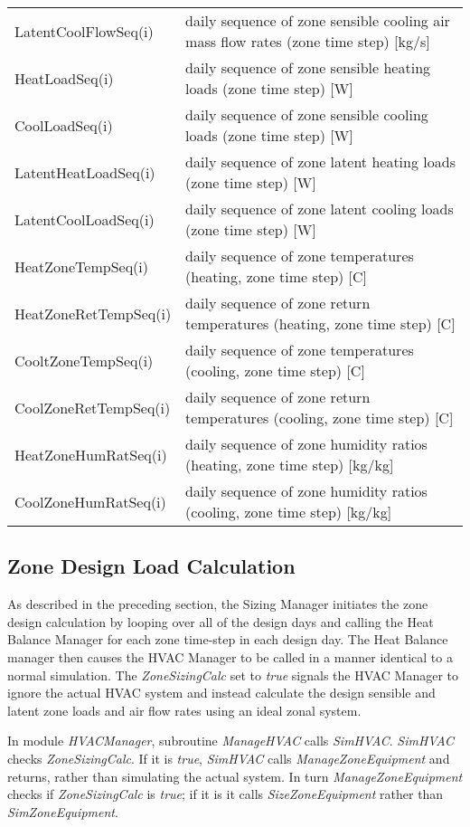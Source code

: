 \begin{longtable}[c]{p{1.85in}p{4.13in}}
LatentCoolFlowSeq(i) & daily sequence of zone sensible cooling air mass flow rates (zone time step) [kg/s] \tabularnewline
HeatLoadSeq(i) & daily sequence of zone sensible heating loads (zone time step) [W] \tabularnewline
CoolLoadSeq(i) & daily sequence of zone sensible cooling loads (zone time step) [W] \tabularnewline
LatentHeatLoadSeq(i) & daily sequence of zone latent heating loads (zone time step) [W] \tabularnewline
LatentCoolLoadSeq(i) & daily sequence of zone latent cooling loads (zone time step) [W] \tabularnewline
HeatZoneTempSeq(i) & daily sequence of zone temperatures (heating, zone time step) [C] \tabularnewline
HeatZoneRetTempSeq(i) & daily sequence of zone return temperatures (heating, zone time step) [C] \tabularnewline
CooltZoneTempSeq(i) & daily sequence of zone temperatures (cooling, zone time step) [C] \tabularnewline
CoolZoneRetTempSeq(i) & daily sequence of zone return temperatures (cooling, zone time step) [C] \tabularnewline
HeatZoneHumRatSeq(i) & daily sequence of zone humidity ratios (heating, zone time step) [kg/kg] \tabularnewline
CoolZoneHumRatSeq(i) & daily sequence of zone humidity ratios (cooling, zone time step) [kg/kg] \tabularnewline
\bottomrule
\end{longtable}

\subsection{Zone Design Load Calculation}\label{zone-design-load-calculation}

As described in the preceding section, the Sizing Manager initiates the zone design calculation by looping over all of the design days and calling the Heat Balance Manager for each zone time-step in each design day. The Heat Balance manager then causes the HVAC Manager to be called in a manner identical to a normal simulation. The \emph{ZoneSizingCalc} set to \emph{true} signals the HVAC Manager to ignore the actual HVAC system and instead calculate the design sensible and latent zone loads and air flow rates using an ideal zonal system.

In module \emph{HVACManager}, subroutine \emph{ManageHVAC} calls \emph{SimHVAC}. \emph{SimHVAC} checks \emph{ZoneSizingCalc}. If it is \emph{true}, \emph{SimHVAC} calls \emph{ManageZoneEquipment} and returns, rather than simulating the actual system. In turn \emph{ManageZoneEquipment} checks if \emph{ZoneSizingCalc} is \emph{true}; if it is it calls \emph{SizeZoneEquipment} rather than \emph{SimZoneEquipment}.

